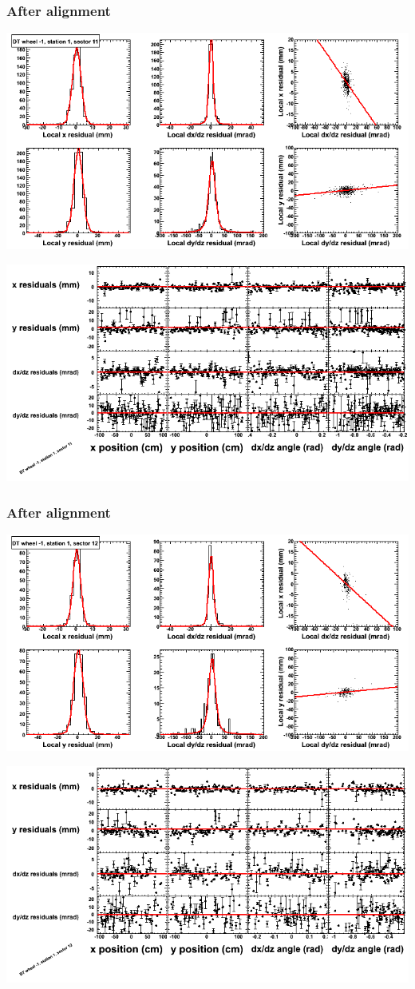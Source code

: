 \documentclass[compress]{beamer}
\begin{document}
\begin{frame}
\frametitle{After alignment}
\includegraphics[width=0.7\linewidth]{NOV4_fitfunctions/MBwhBst1sec11_bellcurves.png}

\includegraphics[width=0.7\linewidth]{NOV4_fitfunctions/MBwhBst1sec11_polynomials.png}
\end{frame}

\begin{frame}
\frametitle{After alignment}
\includegraphics[width=0.7\linewidth]{NOV4_fitfunctions/MBwhBst1sec12_bellcurves.png}

\includegraphics[width=0.7\linewidth]{NOV4_fitfunctions/MBwhBst1sec12_polynomials.png}
\end{frame}
\end{document}

